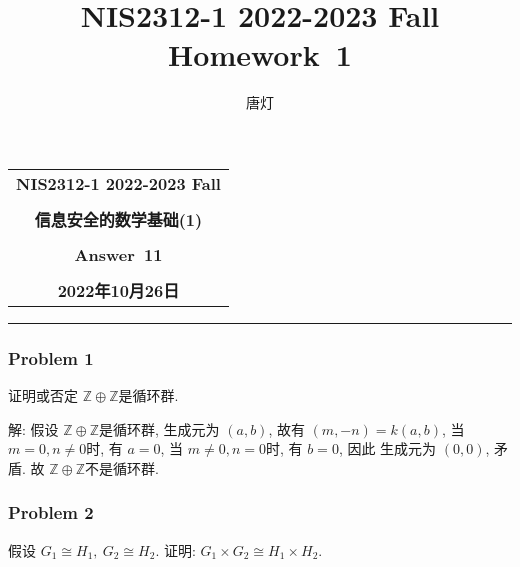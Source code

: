 \documentclass[a4paper,12pt]{ctexart}
\title{NIS2312-1 2022-2023 Fall Homework~1}
\author{唐灯}
\newcommand{\Z}{\mathbb{Z}}
\begin{document}
  \begin{center}

  \vspace{-0.3in}
  \begin{tabular}{c}
    \textbf{\Large NIS2312-1 2022-2023 Fall} \\
    \textbf{\Large  } \\
    \textbf{\Large  信息安全的数学基础(1)} \\
    \textbf{\Large  } \\
    \textbf{\Large  Answer~11} \\
    \textbf{\Large  } \\
    \textbf{\Large 2022年10月26日} \\
  \end{tabular}
  \end{center}
  \noindent
  \rule{\linewidth}{0.4pt}
  

\subsubsection*{Problem 1}
  证明或否定 $ \Z\oplus\Z $是循环群.
  
  解: 假设 $ \Z\oplus\Z $是循环群, 生成元为 $ (a,b) $, 故有 $ (m,-n)=k(a,b) $, 当 $ m=0,n\ne 0 $时, 有 $ a=0 $, 当 $ m\ne 0,n=0 $时, 有 $ b=0 $, 因此 生成元为 $ (0,0) $, 矛盾. 故 $ \Z\oplus\Z $不是循环群.

\subsubsection*{Problem 2} 
    假设 $ G_1\cong H_1,~G_2\cong H_2 $. 证明: $ G_1\times G_2\cong H_1\times H_2 $.
  
\end{document}
